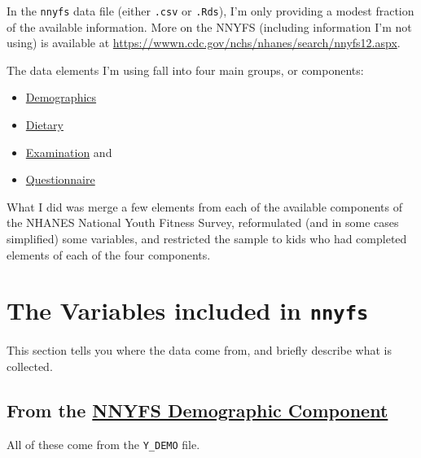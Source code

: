 \documentclass[
]{book}
\providecommand{\tightlist}{%
  \setlength{\itemsep}{0pt}\setlength{\parskip}{0pt}}
\begin{document}
In the \texttt{nnyfs} data file (either \texttt{.csv} or \texttt{.Rds}), I'm only providing a modest fraction of the available information. More on the NNYFS (including information I'm not using) is available at \url{https://wwwn.cdc.gov/nchs/nhanes/search/nnyfs12.aspx}.

The data elements I'm using fall into four main groups, or components:

\begin{itemize}
\tightlist
\item
  \href{https://wwwn.cdc.gov/nchs/nhanes/search/nnyfsdata.aspx?Component=Demographics}{Demographics}
\item
  \href{https://wwwn.cdc.gov/nchs/nhanes/search/nnyfsdata.aspx?Component=Dietary}{Dietary}
\item
  \href{http://wwwn.cdc.gov/nchs/nhanes/search/nnyfsdata.aspx?Component=Examination}{Examination} and
\item
  \href{https://wwwn.cdc.gov/nchs/nhanes/search/nnyfsdata.aspx?Component=Questionnaire}{Questionnaire}
\end{itemize}

What I did was merge a few elements from each of the available components of the NHANES National Youth Fitness Survey, reformulated (and in some cases simplified) some variables, and restricted the sample to kids who had completed elements of each of the four components.

\hypertarget{the-variables-included-in-nnyfs}{%
\section{\texorpdfstring{The Variables included in \texttt{nnyfs}}{The Variables included in nnyfs}}\label{the-variables-included-in-nnyfs}}

This section tells you where the data come from, and briefly describe what is collected.

\hypertarget{from-the-nnyfs-demographic-component}{%
\subsection{\texorpdfstring{From the \href{https://wwwn.cdc.gov/nchs/nhanes/search/nnyfsdata.aspx?Component=Demographics}{NNYFS Demographic Component}}{From the NNYFS Demographic Component}}\label{from-the-nnyfs-demographic-component}}

All of these come from the \texttt{Y\_DEMO} file.
\end{document}
